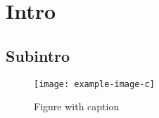 \documentclass{article}
\begin{document}
\listoffigures

\section{Intro}
\subsection{Subintro}

\begin{figure}[h]
  \centering
  \texttt{[image: example-image-c]}%
  \caption{Figure with caption}
\end{figure}
\end{document}
